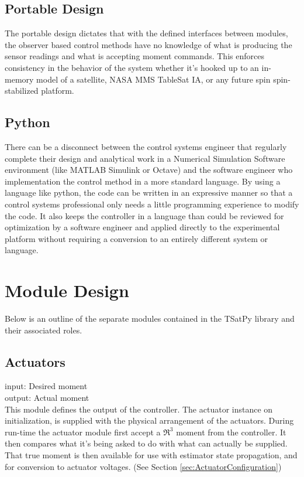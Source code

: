 \subsection{Portable Design}

The portable design dictates that with the defined interfaces between modules, the observer based control methods have no knowledge of what is producing the sensor readings and what is accepting moment commands. This enforces consistency in the behavior of the system whether it's hooked up to an in-memory model of a satellite, NASA MMS TableSat IA, or any future spin spin-stabilized platform.

\subsection{Python}

There can be a disconnect between the control systems engineer that regularly complete their design and analytical work in a Numerical Simulation Software environment (like MATLAB Simulink or Octave) and the software engineer who implementation the control method in a more standard language. By using a language like python, the code can be written in an expressive manner so that a control systems professional only needs a little programming experience to modify the code. It also keeps the controller in a language than could be reviewed for optimization by a software engineer and applied directly to the experimental platform without requiring a conversion to an entirely different system or language.


\section{Module Design}
\label{sec:Module Design}

Below is an outline of the separate modules contained in the TSatPy library and their associated roles.

\subsection{Actuators}
\label{subsec:actuators}

input: Desired moment\\
output: Actual moment\\

This module defines the output of the controller. The actuator instance on initialization, is supplied with the physical arrangement of the actuators. During run-time the actuator module first accept a $\Re^3$ moment from the controller.  It then compares what it's being asked to do with what can actually be supplied.  That true moment is then available for use with estimator state propagation, and for conversion to actuator voltages. (See Section \ref{sec:ActuatorConfiguration})

